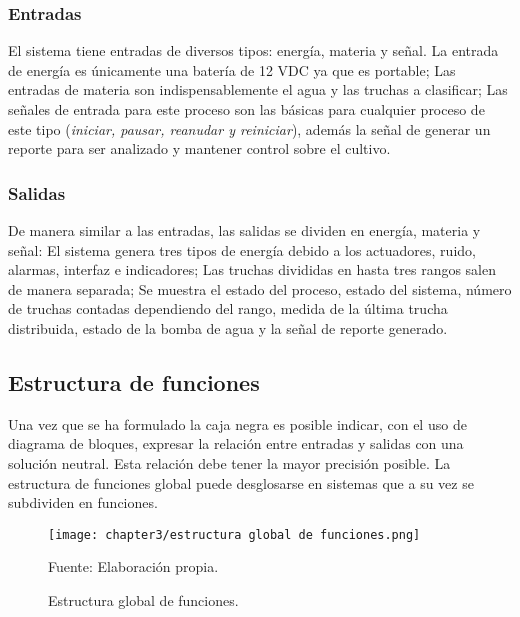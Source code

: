 \subsubsection{Entradas}

El sistema tiene entradas de diversos tipos: energía, materia y señal. La entrada de energía es únicamente una batería de 12 VDC ya que es portable; Las entradas de materia son indispensablemente el agua y las truchas a clasificar; Las señales de entrada para este proceso son las básicas para cualquier proceso de este tipo (\textit{iniciar, pausar, reanudar y reiniciar}), además la señal de generar un reporte para ser analizado y mantener control sobre el cultivo.

\subsubsection{Salidas}

De manera similar a las entradas, las salidas se dividen en energía, materia y señal: El sistema genera tres tipos de energía debido a los actuadores, ruido, alarmas, interfaz e indicadores; Las truchas divididas en hasta tres rangos salen de manera separada; Se muestra el estado del proceso, estado del sistema, número de truchas contadas dependiendo del rango, medida de la última trucha distribuida, estado de la bomba de agua y la señal de reporte generado.

\subsection{Estructura de funciones}

Una vez que se ha formulado la caja negra es posible indicar, con el uso de diagrama de bloques, expresar la relación entre entradas y salidas con una solución neutral. Esta relación debe tener la mayor precisión posible. La estructura de funciones global puede desglosarse en sistemas que a su vez se subdividen en funciones.\cite[p.~169-181]{Pahl2007}

\newpage
\thispagestyle{mylandscape}
\begin{landscape}
	\begin{figure}[H]
		\centering
		\texttt{[image: chapter3/estructura global de funciones.png]}
		\caption{Estructura global de funciones.}
		Fuente: Elaboración propia.
		\label{fig:estructura global de funciones}
	\end{figure}
\end{landscape}

